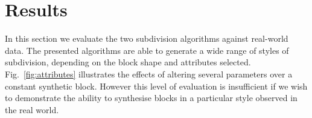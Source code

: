 \begin{comment}
An assumption made by our consistency mapping solution is that both the order and the number of the verticies of $B$ remain unchanged.
One of the most common editing cases is adding a new road segment with one endpoint splitting one of the road segments enclosing $B$, forming a T-shaped junction and
increasing the number of verticies in $C(B)$ by one.
However, in our solution the new vertex is explicitly ignored during consistency computation
while it remains collinear to its adjacent verticies along the contour of $B$.
While many other edits are possible (e.g., a non-collinear vertex is added or removed), it is often unclear, even to a human,
how consistency is defined and established between a block before and after an editing operation.
Thus, although arbitrary edits can be performed with our GUI, we have not explicitly addressed all cases.
Similarly, certain sequences of geometric changes (e.g., scaling a block down and then back up)
result in some parcels being removed and then added again. In order to support subdivision consistency throughout the entire editing sequence,
comparison with several previous subdivision states would be required. Our user experience and system design decision is to support consistency
only with respect to the previous state.


\begin{figure}
\centering
\def\svgwidth{0.7\columnwidth}

\caption[An example of an interactive editing session]{\label{fig:parcelMatching}An example of an integrative editing session with our tool. The system is able to maintain the parcel identities (different coloured solids) under various user edits.}
\end{figure}

\end{comment}

\FloatBarrier
\section{Results}
\label{ref:results}


In this section we evaluate the two subdivision algorithms against real-world data. The presented algorithms are able to generate a wide range of styles of subdivision, depending on the block shape and attributes selected. Fig.~\ref{fig:attributes} illustrates the effects of altering several parameters over a constant synthetic block. However this level of evaluation is insufficient if we wish to demonstrate the ability to synthesise blocks in a particular style observed in the real world. 

